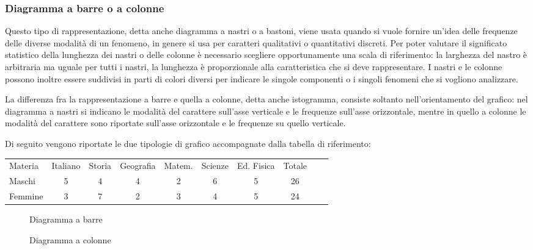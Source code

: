 \subsubsection{Diagramma a barre o a colonne}
Questo tipo di rappresentazione, detta anche diagramma a nastri o a 
bastoni, viene usata quando si vuole fornire un'idea delle frequenze
delle diverse modalità di un fenomeno, in genere si usa per caratteri 
qualitativi o quantitativi discreti.
Per poter valutare il significato statistico della lunghezza dei nastri o 
delle colonne è necessario scegliere opportunamente una scala di 
riferimento:
la larghezza del nastro è arbitraria ma uguale per tutti i nastri, la 
lunghezza è proporzionale alla caratteristica che si deve rappresentare.
I nastri e le colonne possono inoltre essere suddivisi in parti di colori 
diversi per indicare le singole componenti o i singoli fenomeni
che si vogliono analizzare.

La differenza fra la rappresentazione a barre e quella a colonne, detta 
anche istogramma, consiste soltanto
nell'orientamento del grafico: nel diagramma a nastri si indicano le 
modalità del carattere sull'asse verticale e le frequenze sull'asse 
orizzontale,
mentre in quello a colonne le modalità del carattere sono riportate 
sull'asse
orizzontale e le frequenze su quello verticale.

Di seguito vengono riportate le due tipologie di grafico accompagnate dalla 
tabella di riferimento:

\begin{center}
 \begin{tabularx}{.95\textwidth}{X*{7}{c}Xc}
\toprule
Materia& Italiano &Storia & Geografia & Matem. & Scienze & Ed. Fisica & 
Totale\\
Maschi & 5 & 4& 4 & 2& 6 & 5& 26\\
Femmine & 3 & 7 & 2 & 3  & 4 & 5 & 24\\
\bottomrule
\end{tabularx}
\end{center}
\begin{center}
\begin{figure}[!h]
\begin{minipage}{.5\textwidth}
\begin{inaccessibleblock}

\caption{Diagramma a barre}
\end{inaccessibleblock}
\end{minipage} 
\begin{minipage}{.5\textwidth}
\begin{inaccessibleblock}
 
\caption{Diagramma a colonne}
\end{inaccessibleblock}
\end{minipage}
\end{figure} 

\end{center}

